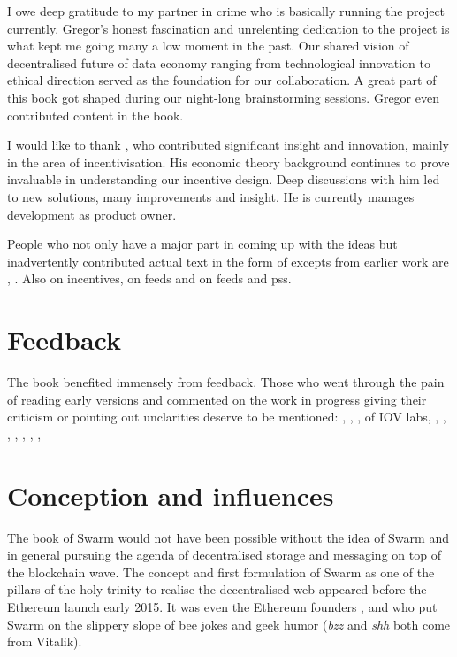 I owe deep gratitude to my partner in crime  who is basically running the project currently. Gregor's honest fascination and unrelenting dedication to the project is what kept me going many a low moment in the past. Our shared vision of decentralised future of data economy ranging from technological innovation to ethical direction served as the foundation for our collaboration. A great part of this book got shaped during our night-long brainstorming sessions. Gregor even contributed content in the book.

I would like to thank , who contributed significant insight and innovation, mainly in the area of incentivisation. His economic theory background continues to prove invaluable in understanding our incentive design. Deep discussions with him led to new solutions, many improvements and insight. He is currently manages development as product owner.

People who not only have a major part in coming up with the ideas but inadvertently contributed actual text in the form of excepts from earlier work are , . Also  on incentives,  
 on feeds and  on feeds and pss. 

\section*{Feedback}

The book benefited immensely from feedback. Those who went through the pain of reading early versions and commented on the work in progress giving their criticism or pointing out unclarities deserve to be mentioned: , , ,  of IOV labs, 
, , 
, ,  , , , 



\section*{Conception and influences}

The book of Swarm would not have been possible without the idea of Swarm and in general pursuing the agenda of decentralised storage and messaging on top of the blockchain wave. The concept and first formulation of Swarm as one of the pillars of the holy trinity to realise the decentralised web appeared before the Ethereum launch early 2015. It was even the Ethereum founders ,  and  who put Swarm on the slippery slope of bee jokes and geek humor (\emph{bzz} and \emph{shh} both come from Vitalik). 

